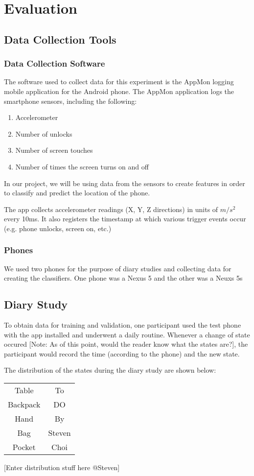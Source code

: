 \section{Evaluation}

\subsection{Data Collection Tools}
\subsubsection{Data Collection Software}
The software used to collect data for this experiment is the AppMon logging mobile application 
for the Android phone. 
The AppMon application logs the smartphone sensors, including the following:
\begin{enumerate}
\item Accelerometer
\item Number of unlocks
\item Number of screen touches
\item Number of times the screen turns on and off
\end{enumerate}

In our project, we will be using data from the sensors
to create features in order to classify and predict the location of the phone. 

The app collects accelerometer readings (X, Y, Z directions) in units of $m/s^2$ every 10ms.
It also registers the timestamp at which various trigger events occur (e.g. phone unlocks, screen on, etc.)

\subsubsection{Phones}
We used two phones for the purpose of diary studies and collecting data for creating the classifiers.
One phone was a Nexus 5 and the other was a Neuxs 5s


\subsection {Diary Study}
To obtain data for training and validation, one participant used the test phone with the app installed 
and underwent a daily routine.
Whenever a change of state occured [Note: As of this point, would the reader know what the states are?], the participant would record the time (according to the phone) and the new state.


The distribution of the states during the diary study are shown below:


\begin{center}
\begin{tabular}{ |c|c| } 
 \hline
 Table & To \\ 
 Backpack & DO \\ 
 Hand & By \\ 
 Bag & Steven \\ 
 Pocket & Choi \\
 \hline
\end{tabular}
\end{center}
[Enter distribution stuff here @Steven]